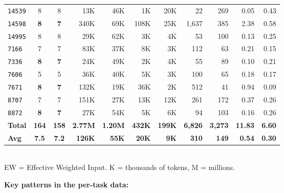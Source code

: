 \begin{table}[!htbp]
\begin{tabular}{l cc rr rr rr rr}
\texttt{14539} & 8 & 8 &  13K &  46K &  1K & 20K &   22 &  269 & 0.05 & 0.43 \\
\rowcolor{gray!15}
\texttt{14598} & \textbf{8} & \textbf{7} & 340K &  69K & 108K & 25K & 1{,}637 & 385 & 2.38 & 0.58 \\
\texttt{14995} & 8 & 8 &  29K &  62K &  3K &  4K &   53 &  100 & 0.13 & 0.25 \\
\texttt{7166}  & 7 & 7 &  83K &  37K &  8K &  3K &  112 &   63 & 0.21 & 0.15 \\
\rowcolor{gray!15}
\texttt{7336}  & \textbf{8} & \textbf{7} &  24K &  49K &  2K &  4K &   55 &   89 & 0.10 & 0.21 \\
\texttt{7606}  & 5 & 5 &  36K &  40K &  5K &  3K &  100 &   65 & 0.18 & 0.17 \\
\rowcolor{gray!15}
\texttt{7671}  & \textbf{8} & \textbf{7} & 132K &  19K & 36K &  2K &  512 &   41 & 0.94 & 0.09 \\
\texttt{8707}  & 7 & 7 & 151K &  27K & 13K & 12K &  261 &  172 & 0.37 & 0.26 \\
\rowcolor{gray!15}
\texttt{8872}  & \textbf{8} & \textbf{7} &  27K &  54K &  5K &  6K &   94 &  103 & 0.16 & 0.26 \\
\midrule
\textbf{Total} & \textbf{164} & \textbf{158}
               & \textbf{2.77M} & \textbf{1.20M}
               & \textbf{432K} & \textbf{199K}
               & \textbf{6{,}826} & \textbf{3{,}273}
               & \textbf{11.83} & \textbf{6.60} \\
\textbf{Avg}   & \textbf{7.5} & \textbf{7.2}
               & \textbf{126K} & \textbf{55K}
               & \textbf{20K}  & \textbf{9K}
               & \textbf{310}  & \textbf{149}
               & \textbf{0.54} & \textbf{0.30} \\
\bottomrule
\end{tabular}
\\[4pt]
{\footnotesize
EW = Effective Weighted Input.\quad
K = thousands of tokens, M = millions.}
\end{table}

\noindent
\textbf{Key patterns in the per-task data:}

